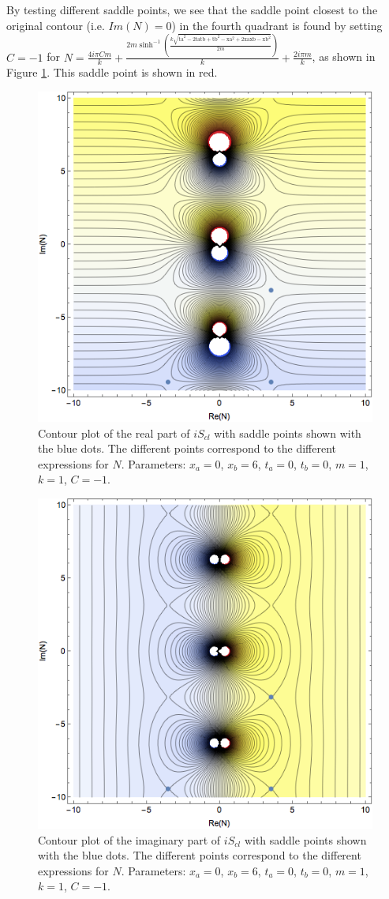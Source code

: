 \documentclass[12pt]{revtex4}
\begin{document}
By testing different saddle points, we see that the saddle point closest to the original contour (i.e. $Im(N)=0$) in the fourth quadrant is found by setting $C=-1$ for $N=\frac{4 i \pi  C m}{k} + \frac{2 m \sinh ^{-1}\left(\frac{k \sqrt{\text{ta}^2-2 \text{ta} \text{tb}+\text{tb}^2-\text{xa}^2+2 \text{xa} \text{xb}-\text{xb}^2}}{2 m}\right)}{k}+\frac{2 i \pi  m}{k}$, as shown in Figure \ref{fig:realcontour}. This saddle point is shown in red.

\begin{figure}[h]
	\centering
	\includegraphics[width=0.7\linewidth]{realcontour}
	\caption{Contour plot of the real part of $i S_{cl}$ with saddle points shown with the blue dots. The different points correspond to the different expressions for $N$.	Parameters: $x_a=0$, $x_b=6$, $t_a=0$, $t_b=0$, $m=1$, $k=1$, $C=-1$.}
	\label{fig:realcontour}
\end{figure}

\begin{figure}[h]
	\centering
	\includegraphics[width=0.7\linewidth]{imaginarycontour}
	\caption{Contour plot of the imaginary part of $i S_{cl}$ with saddle points shown with the blue dots. The different points correspond to the different expressions for $N$. Parameters: $x_a=0$, $x_b=6$, $t_a=0$, $t_b=0$, $m=1$, $k=1$, $C=-1$.}
	\label{fig:imcontour}
\end{figure}
\end{document}
